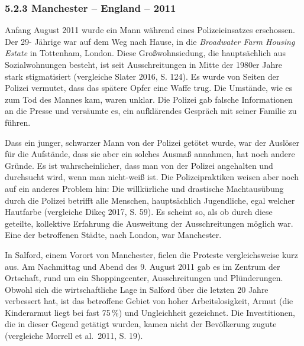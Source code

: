 \documentclass[a4paper,
fontsize=11pt,
oneside,
numbers=noperiodatend,
parskip=half-,
bibliography=totoc,
final
]{scrartcl}
\begin{document}
\hypertarget{manchester-england-2011}{%
\subsubsection{5.2.3 Manchester -- England --
2011}\label{manchester-england-2011}}

Anfang August 2011 wurde ein Mann während eines Polizeieinsatzes
erschossen. Der 29- Jährige war auf dem Weg nach Hause, in die
\emph{Broadwater Farm Housing Estate} in Tottenham, London. Diese
Großwohnsiedung, die hauptsächlich aus Sozialwohnungen besteht, ist seit
Ausschreitungen in Mitte der 1980er Jahre stark stigmatisiert
(vergleiche Slater 2016, S. 124). Es wurde von Seiten der Polizei
vermutet, dass das spätere Opfer eine Waffe trug. Die Umstände, wie es
zum Tod des Mannes kam, waren unklar. Die Polizei gab falsche
Informationen an die Presse und versäumte es, ein aufklärendes Gespräch
mit seiner Familie zu führen.

Dass ein junger, schwarzer Mann von der Polizei getötet wurde, war der
Auslöser für die Aufstände, dass sie aber ein solches Ausmaß annahmen,
hat noch andere Gründe. Es ist wahrscheinlicher, dass man von der
Polizei angehalten und durchsucht wird, wenn man nicht-weiß ist. Die
Polizeipraktiken weisen aber noch auf ein anderes Problem hin: Die
willkürliche und drastische Machtausübung durch die Polizei betrifft
alle Menschen, hauptsächlich Jugendliche, egal welcher Hautfarbe
(vergleiche Dikeç 2017, S. 59). Es scheint so, als ob durch diese
geteilte, kollektive Erfahrung die Ausweitung der Ausschreitungen
möglich war. Eine der betroffenen Städte, nach London, war Manchester.

In Salford, einem Vorort von Manchester, fielen die Proteste
vergleichsweise kurz aus. Am Nachmittag und Abend des 9. August 2011 gab
es im Zentrum der Ortschaft, rund um ein Shoppingcenter, Ausschreitungen
und Plünderungen. Obwohl sich die wirtschaftliche Lage in Salford über
die letzten 20 Jahre verbessert hat, ist das betroffene Gebiet von hoher
Arbeitslosigkeit, Armut (die Kinderarmut liegt bei fast 75\,\%) und
Ungleichheit gezeichnet. Die Investitionen, die in dieser Gegend
getätigt wurden, kamen nicht der Bevölkerung zugute (vergleiche Morrell
et al.~2011, S. 19).
\end{document}
